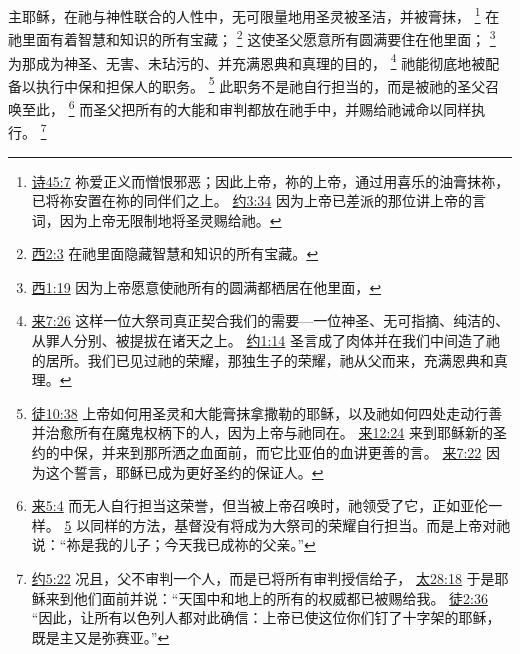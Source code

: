 \documentclass[12pt, a4paper, oneside]{ctexart}
\newcounter{parnum}[section]
\newcommand{\N}{%
   \noindent\refstepcounter{parnum}%
    \makebox[\parindent][l]{\textbf{\arabic{parnum}.}}}
\begin{document}
\N 主耶稣，在祂与神性联合的人性中，无可限量地用圣灵被圣洁，并被膏抹，
	\footnote {
		\href{https://biblehub.com/psalms/45-7.htm}{诗45:7} 祢爱正义而憎恨邪恶；因此上帝，祢的上帝，通过用喜乐的油膏抹祢，已将祢安置在祢的同伴们之上。
		\href{https://biblehub.com/john/3-34.htm}{约3:34} 因为上帝已差派的那位讲上帝的言词，因为上帝无限制地将圣灵赐给祂。
	}
	在祂里面有着智慧和知识的所有宝藏；
	\footnote {
		\href{https://biblehub.com/colossians/2-3.htm}{西2:3} 在祂里面隐藏智慧和知识的所有宝藏。
	}
	这使圣父愿意所有圆满要住在他里面；
	\footnote {
		\href{https://biblehub.com/colossians/1-19.htm}{西1:19} 因为上帝愿意使祂所有的圆满都栖居在他里面，
	}
	为那成为神圣、无害、未玷污的、并充满恩典和真理的目的，
	\footnote {
		\href{https://biblehub.com/hebrews/7-26.htm}{来7:26} 这样一位大祭司真正契合我们的需要---一位神圣、无可指摘、纯洁的、从罪人分别、被提拔在诸天之上。
		\href{https://biblehub.com/john/1-14.htm}{约1:14} 圣言成了肉体并在我们中间造了祂的居所。我们已见过祂的荣耀，那独生子的荣耀，祂从父而来，充满恩典和真理。
	}
	祂能彻底地被配备以执行中保和担保人的职务。
	\footnote {
		\href{https://biblehub.com/acts/10-38.htm}{徒10:38} 上帝如何用圣灵和大能膏抹拿撒勒的耶稣，以及祂如何四处走动行善并治愈所有在魔鬼权柄下的人，因为上帝与祂同在。
		\href{https://biblehub.com/hebrews/12-24.htm}{来12:24} 来到耶稣新的圣约的中保，并来到那所洒之血面前，而它比亚伯的血讲更善的言。
		\href{https://biblehub.com/hebrews/7-22.htm}{来7:22} 因为这个誓言，耶稣已成为更好圣约的保证人。
	}
	此职务不是祂自行担当的，而是被祂的圣父召唤至此，
	\footnote {
		\href{https://biblehub.com/hebrews/5-4.htm}{来5:4} 而无人自行担当这荣誉，但当被上帝召唤时，祂领受了它，正如亚伦一样。
		\href{https://biblehub.com/hebrews/5-5.htm}{5} 以同样的方法，基督没有将成为大祭司的荣耀自行担当。而是上帝对祂说：“祢是我的儿子；今天我已成祢的父亲。”
	}
	而圣父把所有的大能和审判都放在祂手中，并赐给祂诫命以同样执行。
	\footnote {
		\href{https://biblehub.com/john/5-22.htm}{约5:22} 况且，父不审判一个人，而是已将所有审判授信给子，
		\href{https://biblehub.com/matthew/28-18.htm}{太28:18} 于是耶稣来到他们面前并说：“天国中和地上的所有的权威都已被赐给我。
		\href{https://biblehub.com/acts/2-36.htm}{徒2:36} “因此，让所有以色列人都对此确信：上帝已使这位你们钉了十字架的耶稣，既是主又是弥赛亚。”
	}
\end{document}

